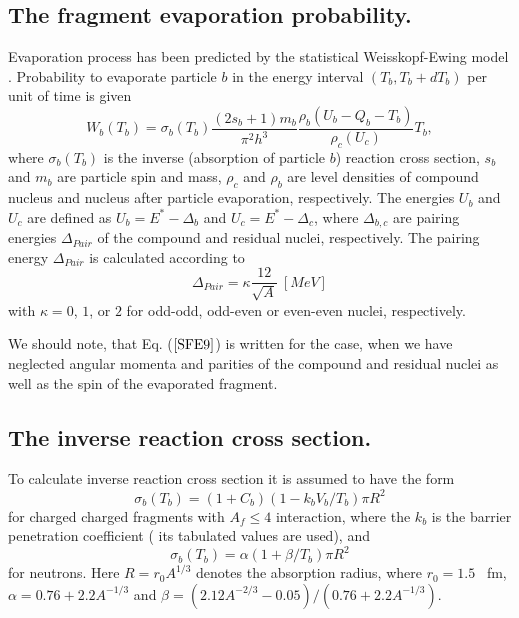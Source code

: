 \subsection{The fragment evaporation probability.} 

\hspace{1.0em}Evaporation process has been  predicted by the statistical
Weisskopf-Ewing model \cite{WE40}.  Probability to evaporate particle
$b$ in the energy interval $(T_b, T_b+dT_b)$ per unit of time is given
\begin{equation}
\label{SFE9}W_{b}(T_b) = \sigma_{b}(T_b)\frac{(2s_b+1)m_b}{\pi^2 h^3}
\frac{\rho_b(U_b - Q_b-T_b)}{\rho_c(U_c)}T_b,
\end{equation}
where $\sigma_{b}(T_b)$ is the inverse (absorption of particle $b$)
reaction cross section, $s_b$ and $m_b$ are particle spin and mass,
  $\rho_c$ and $\rho_b$ are level densities of compound nucleus  and
nucleus after particle evaporation, respectively.
The energies $U_b$ and $U_c$ are defined as $U_b = E^{*} - \Delta_b$ 
and $U_c = E^{*} - \Delta_c$, where $\Delta_{b,c}$ are pairing energies 
$\Delta_{Pair}$
of the compound and residual nuclei, respectively.
The pairing energy $\Delta_{Pair}$ is calculated according to
\begin{equation}
\label{SFE10} \Delta_{Pair} = \kappa \frac{12}{\sqrt{A}} \ [MeV]
\end{equation}
with $\kappa = 0$, $1$, or $2$ for odd-odd, odd-even or even-even 
nuclei, respectively.

We should note, that Eq. ($\ref{SFE9}$) is written for the case, 
when we have neglected angular momenta and parities
of the compound and residual nuclei as well as the spin 
of the evaporated fragment.
 
\subsection{The inverse reaction cross section.}

\hspace{1.0em}To calculate inverse   reaction cross section it is
assumed to have the form \cite{Dostr59}
\begin{equation}
\label{SFE11} 
\sigma _b(T_b ) = (1+C_b)(1-k_bV_b/T_b )\pi R^2 
\end{equation}
for charged charged fragments with $A_f \leq 4$ interaction, where the
$k_b$ is the barrier penetration coefficient ( its tabulated values are
used), and
\begin{equation}
\label{SFE12} 
\sigma _b(T_b ) = \alpha (1 + \beta /T_b )\pi R^2 
\end{equation}
for neutrons. Here $R = r_{0} A^{1/3}$ denotes the absorption radius, where 
$r_0 = 1.5$ \ fm, 
$\alpha =0.76 + 2.2 A^{-1/3}$ and $\beta=(2.12 A^{-2/3} - 0.05)/(0.76 +
2.2 A^{-1/3})$.

